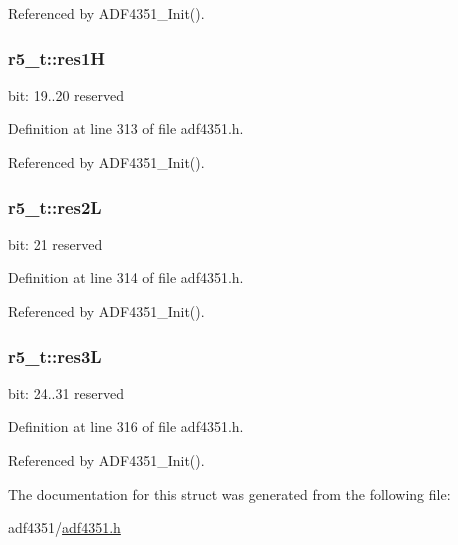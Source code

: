 Referenced by A\+D\+F4351\+\_\+\+Init().

\subsubsection[{\texorpdfstring{res1H}{res1H}}]{ r5\+\_\+t\+::res1H}\hypertarget{structr5__t_ac2077b2cbd35a25d80a3b485aeeeca16}{}\label{structr5__t_ac2077b2cbd35a25d80a3b485aeeeca16}
bit\+: 19..20 reserved 

Definition at line 313 of file adf4351.\+h.



Referenced by A\+D\+F4351\+\_\+\+Init().

\subsubsection[{\texorpdfstring{res2L}{res2L}}]{ r5\+\_\+t\+::res2L}\hypertarget{structr5__t_ad6a330a8f3ac938062893adae1547ad2}{}\label{structr5__t_ad6a330a8f3ac938062893adae1547ad2}
bit\+: 21 reserved 

Definition at line 314 of file adf4351.\+h.



Referenced by A\+D\+F4351\+\_\+\+Init().

\subsubsection[{\texorpdfstring{res3L}{res3L}}]{ r5\+\_\+t\+::res3L}\hypertarget{structr5__t_a4b3d74a8e15b3a85981a8cc7fe4c26b4}{}\label{structr5__t_a4b3d74a8e15b3a85981a8cc7fe4c26b4}
bit\+: 24..31 reserved 

Definition at line 316 of file adf4351.\+h.



Referenced by A\+D\+F4351\+\_\+\+Init().



The documentation for this struct was generated from the following file\+:\begin{DoxyCompactItemize}
\item 
adf4351/\hyperlink{adf4351_8h}{adf4351.\+h}\end{DoxyCompactItemize}
